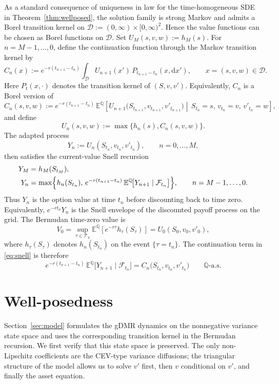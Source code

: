\documentclass[10pt]{article}
\theoremstyle{plain}
\theoremstyle{definition}
\theoremstyle{remark}
\newcommand{\dd}{\mathrm d}
\newcommand{\E}{\mathbb E}
\newcommand{\Q}{\mathbb Q}
\begin{document}
As a standard consequence of uniqueness in law for the time-homogeneous SDE in Theorem~\ref{thm:wellposed}, the solution family is strong Markov and admits a Borel transition kernel on $\mathcal D:=(0,\infty)\times[0,\infty)^2$. Hence the value functions can be chosen as Borel functions on $\mathcal D$. Set $U_M(s,v,w):=h_M(s)$. For $n=M-1,\dots,0$, define the continuation function through the Markov transition kernel by
\[
C_n(x):=
e^{-r(t_{n+1}-t_n)}
\int_{\mathcal D} U_{n+1}(x')\,P_{t_{n+1}-t_n}(x,\dd x'),
\qquad x=(s,v,w)\in\mathcal D.
\]
Here $P_t(x,\cdot)$ denotes the transition kernel of $(S,v,v')$. Equivalently, $C_n$ is a Borel version of
\[
C_n(s,v,w)
:=e^{-r(t_{n+1}-t_n)}\,\E^\Q\!\left[
U_{n+1}\bigl(S_{t_{n+1}},v_{t_{n+1}},v'_{t_{n+1}}\bigr)
\middle|\,
S_{t_n}=s,\,v_{t_n}=v,\,v'_{t_n}=w
\right],
\]
and define
\[
U_n(s,v,w):=\max\{h_n(s),C_n(s,v,w)\}.
\]
The adapted process
\[
Y_n:=U_n(S_{t_n},v_{t_n},v'_{t_n}),\qquad n=0,\dots,M,
\]
then satisfies the current-value Snell recursion
\begin{equation}\label{eq:snell}
\begin{aligned}
Y_M&=h_M(S_{t_M}),\\
Y_n&=\max\Bigl\{h_n(S_{t_n}),\,
e^{-r(t_{n+1}-t_n)}\,
\E^\Q\!\bigl[Y_{n+1}\mid\mathcal F_{t_n}\bigr]\Bigr\},
\qquad n=M-1,\dots,0.
\end{aligned}
\end{equation}
Thus $Y_n$ is the option value at time $t_n$ before discounting back to time zero. Equivalently, $e^{-rt_n}Y_n$ is the Snell envelope of the discounted payoff process on the grid. The Bermudan time-zero value is
\[
V_0
=\sup_{\tau\in\mathcal T_\pi}\E^\Q\!\left[e^{-r\tau}h_\tau(S_\tau)\right]
=U_0(S_0,v_0,v'_0),
\]
where $h_\tau(S_\tau)$ denotes $h_n(S_{t_n})$ on the event $\{\tau=t_n\}$. The continuation term in \eqref{eq:snell} is therefore
\[
e^{-r(t_{n+1}-t_n)}\,\E^\Q\!\bigl[Y_{n+1}\mid\mathcal F_{t_n}\bigr]
=C_n\bigl(S_{t_n},v_{t_n},v'_{t_n}\bigr)\qquad\text{$\Q$-a.s.}
\]




\section{Well-posedness}\label{sec:wellposed}

Section~\ref{sec:model} formulates the gDMR dynamics on the nonnegative variance state space and uses the corresponding transition kernel in the Bermudan recursion. We first verify that this state space is preserved. The only non-Lipschitz coefficients are the CEV-type variance diffusions; the triangular structure of the model allows us to solve $v'$ first, then $v$ conditional on $v'$, and finally the asset equation.
\end{document}
